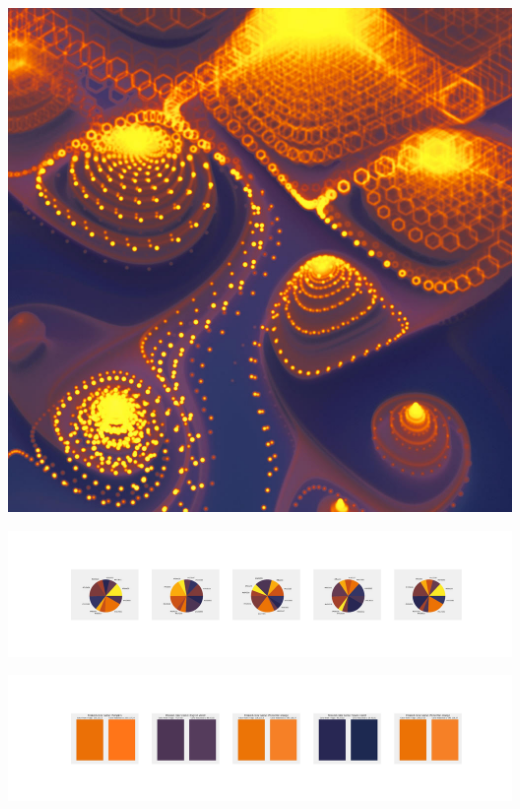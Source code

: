\documentclass[11pt]{article}
\begin{document}
\begin{landscape}
    \begin{center}
    \includegraphics[width=\textwidth]{./nbimg/file (314).jpg}
    \end{center}

    \begin{center}
    \includegraphics[width=250mm]{./nbimg/pie-239.jpg}
    \end{center}

    \begin{center}
    \includegraphics[width=250mm]{./nbimg/peak-239.jpg}
    \end{center}
    


\end{landscape}
\end{document}
